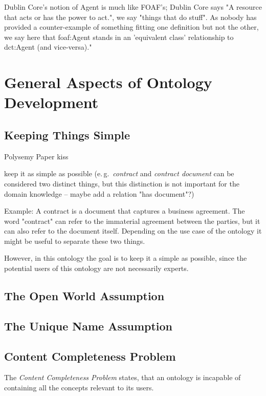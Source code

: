 \documentclass[a4paper, DIV=13, BCOR=0cm]{scrbook}
\newcommand{\eg}{e.\,g.\ }
\begin{document}
Dublin Core's notion of Agent is much like FOAF's; Dublin Core says "A resource that acts or has the power to act.", we say "things that do stuff". As nobody has provided a counter-example of something fitting one definition but not the other, we say here that foaf:Agent stands in an 'equivalent class' relationship to dct:Agent (and vice-versa)." \cite[
External Vocabulary References]{Dan-Brickley2014FOAF-Vocabulary}



\section{General Aspects of Ontology Development}
\label{general-aspects}

\subsection{Keeping Things Simple }
\label{keeping-things-simple}
Polysemy Paper \cite{arapinis2015plea}
\gls{kiss}

keep it as simple as possible (\eg \textit{contract} and \textit{contract document} can be considered two distinct things, but this distinction is not important for the domain knowledge -- maybe add a relation "has document"?)

Example: A contract is a document that captures a business agreement. The word "contract" can refer to the immaterial agreement between the parties, but it can also refer to the document itself. Depending on the use case of the ontology it might be useful to separate these two things.

However, in this ontology the goal is to keep it a simple as possible, since the potential users of this ontology are not necessarily experts.

\subsection{The Open World Assumption}
\subsection{The Unique Name Assumption}
\subsection{Content Completeness Problem}
The \textit{Content Completeness Problem} states, that an ontology is incapable of containing all the concepts relevant to its users.
\end{document}
